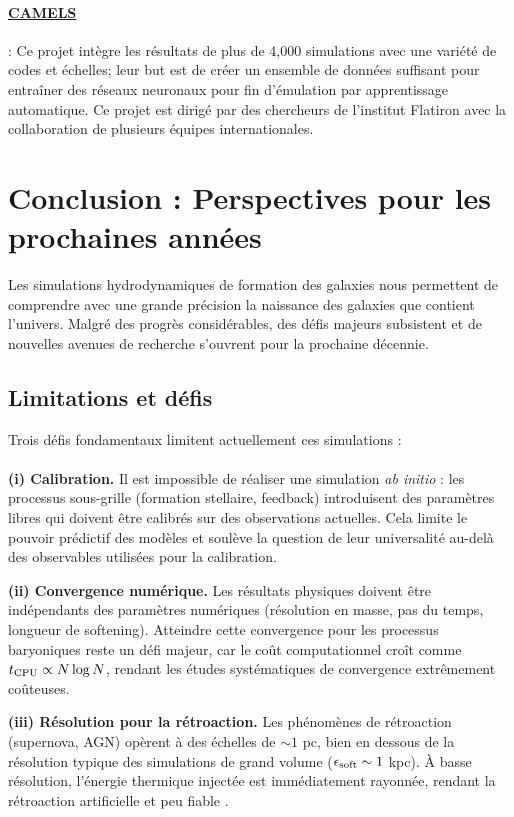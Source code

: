 \documentclass{article}
\begin{document}
\paragraph{\href{https://www.camel-simulations.org/}{CAMELS}} \citep{CAMELS}: Ce projet intègre les résultats de plus de 4,000 simulations avec une variété de codes et échelles; leur but est de créer un ensemble de données suffisant pour entraîner des réseaux neuronaux pour fin d'émulation par apprentissage automatique. Ce projet est dirigé par des chercheurs de l'institut Flatiron avec la collaboration de plusieurs équipes internationales.  


\section{Conclusion : Perspectives pour les prochaines années}
Les simulations hydrodynamiques de formation des galaxies nous permettent de comprendre avec une grande précision la naissance des galaxies que contient l'univers. Malgré des progrès 
considérables, des défis majeurs subsistent et de nouvelles avenues de recherche s'ouvrent pour la prochaine décennie.

\subsection{Limitations et défis}
Trois défis fondamentaux limitent actuellement ces simulations \cite{Vogelsberger2020} :\\
\\\textbf{(i) Calibration.} Il est impossible de réaliser une simulation \textit{ab initio} : les processus sous-grille 
(formation stellaire, feedback) introduisent des paramètres libres 
qui doivent être calibrés sur des observations actuelles. Cela limite 
le pouvoir prédictif des modèles et soulève la question de leur 
universalité au-delà des observables utilisées pour la calibration.

\textbf{(ii) Convergence numérique.} Les résultats physiques doivent 
être indépendants des paramètres numériques (résolution en masse, 
pas du temps, longueur de softening). Atteindre cette convergence 
pour les processus baryoniques reste un défi majeur, car le coût 
computationnel 
croît comme $t_{\rm CPU} \propto N \log N$, rendant 
les études systématiques de convergence extrêmement coûteuses.

\textbf{(iii) Résolution pour la rétroaction.} Les phénomènes de 
rétroaction (supernova, AGN) opèrent à des échelles de $\sim 1$ pc, 
bien en dessous de la résolution typique des simulations de grand 
volume ($\epsilon_{\rm soft} \sim 1$ kpc). À basse résolution, 
l'énergie thermique injectée est immédiatement rayonnée, rendant la rétroaction artificielle et peu fiable \cite{SpringelHernquist2003}.
\end{document}
